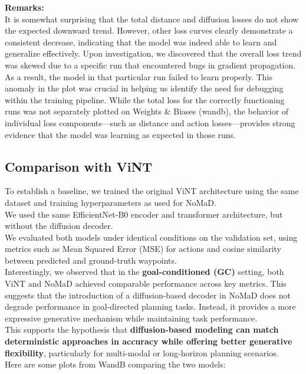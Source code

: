 \documentclass[12pt]{article}
\begin{document}
\noindent \textbf{Remarks:}\\
It is somewhat surprising that the total distance and diffusion losses do not show the expected downward trend. However, other loss curves clearly demonstrate a consistent decrease, indicating that the model was indeed able to learn and generalize effectively.
Upon investigation, we discovered that the overall loss trend was skewed due to a specific run that encountered bugs in gradient propagation. As a result, the model in that particular run failed to learn properly. This anomaly in the plot was crucial in helping us identify the need for debugging within the training pipeline.  
While the total loss for the correctly functioning runs was not separately plotted on Weights $\&$ Biases (wandb), the behavior of individual loss components—such as distance and action losses—provides strong evidence that the model was learning as expected in those runs.

\subsection*{Comparison with ViNT}
To establish a baseline, we trained the original ViNT architecture using the same dataset and training hyperparameters as used for NoMaD.\\
We used the same EfficientNet-B0 encoder and transformer architecture, but without the diffusion decoder.\\
We evaluated both models under identical conditions on the validation set, using metrics such as Mean Squared Error (MSE) for actions and cosine similarity between predicted and ground-truth waypoints.\\
Interestingly, we observed that in the \textbf{goal-conditioned (GC)} setting, both ViNT and NoMaD achieved comparable performance across key metrics. This suggests that the introduction of a diffusion-based decoder in NoMaD does not degrade performance in goal-directed planning tasks. Instead, it provides a more expressive generative mechanism while maintaining task performance.\\
This supports the hypothesis that \textbf{diffusion-based modeling can match deterministic approaches in accuracy while offering better generative flexibility}, particularly for multi-modal or long-horizon planning scenarios.\\
Here are some plots from WandB comparing the two models:\\
\end{document}
